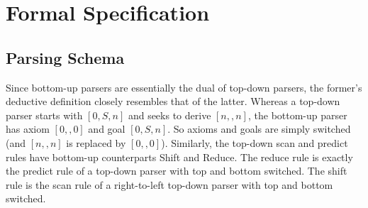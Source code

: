 \begin{center}
    \hspace{1em}
\end{center}


\section{Formal Specification}
\label{sec:BottomUp_Formal}

\subsection{Parsing Schema}
\label{sub:BottomUp_Schema}

Since bottom-up parsers are essentially the dual of top-down parsers, the former's deductive definition closely resembles that of the latter.
Whereas a top-down parser starts with $[0,S,n]$ and seeks to derive $[n,,n]$, the bottom-up parser has axiom $[0,,0]$ and goal $[0,S,n]$.
So axioms and goals are simply switched (and $[n,,n]$ is replaced by $[0,,0]$).
Similarly, the top-down scan and predict rules have bottom-up counterparts Shift and Reduce.
The reduce rule is exactly the predict rule of a top-down parser with top and bottom switched.
The shift rule is the scan rule of a right-to-left top-down parser with top and bottom switched. 

